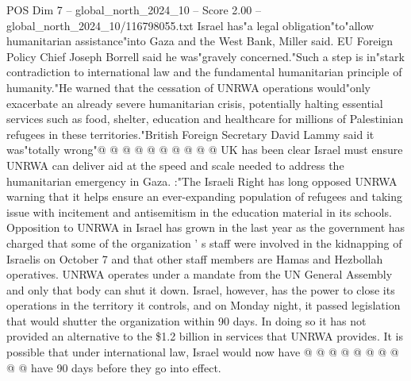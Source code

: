 \begin{textsample}{POS Dim 7 – global\_north\_2024\_10 – Score 2.00 – global\_north\_2024\_10/116798055.txt}
Israel has"a legal obligation"to"allow humanitarian assistance"into Gaza and the West Bank, Miller said.
EU Foreign Policy Chief Joseph Borrell said he was"gravely concerned."Such a step is in"stark contradiction to international law and the fundamental humanitarian principle of humanity."He warned that the cessation of UNRWA operations would"only exacerbate an already severe humanitarian crisis, potentially halting essential services such as food, shelter, education and healthcare for millions of Palestinian refugees in these territories."British Foreign Secretary David Lammy said it was"totally wrong"@ @ @ @ @ @ @ @ @ @ UK has been clear Israel must ensure UNRWA can deliver aid at the speed and scale needed to address the humanitarian emergency in Gaza. :"The Israeli Right has long opposed UNRWA warning that it helps ensure an ever-expanding population of refugees and taking issue with incitement and antisemitism in the education material in its schools.
Opposition to UNRWA in Israel has grown in the last year as the government has charged that some of the organization ' s staff were involved in the kidnapping of Israelis on October 7 and that other staff members are Hamas and Hezbollah operatives.
UNRWA operates under a mandate from the UN General Assembly and only that body can shut it down.
Israel, however, has the power to close its operations in the territory it controls, and on Monday night, it passed legislation that would shutter the organization within 90 days.
In doing so it has not provided an alternative to the \$1.2 billion in services that UNRWA provides.
It is possible that under international law, Israel would now have @ @ @ @ @ @ @ @ @ @ have 90 days before they go into effect.

\end{textsample}
